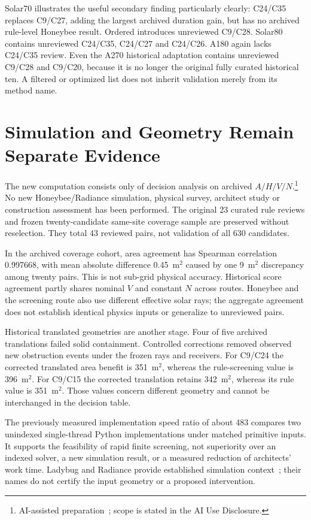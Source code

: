 \documentclass{llncs}
\newcommand{\aidraft}{\footnote{AI-assisted preparation~\cite{openai2026}; scope is stated in the AI Use Disclosure.}}
\begin{document}

Solar70 illustrates the useful secondary finding particularly clearly: C24/C35 replaces C9/C27, adding the largest archived duration gain, but has no archived rule-level Honeybee result. Ordered introduces unreviewed C9/C28. Solar80 contains unreviewed C24/C35, C24/C27 and C24/C26. A180 again lacks C24/C35 review. Even the A270 historical adaptation contains unreviewed C9/C28 and C9/C20, because it is no longer the original fully curated historical ten. A filtered or optimized list does not inherit validation merely from its method name.

\section{Simulation and Geometry Remain Separate Evidence}
The new computation consists only of decision analysis on archived $A/H/V/N$.\aidraft{} No new Honeybee/Radiance simulation, physical survey, architect study or construction assessment has been performed. The original 23 curated rule reviews and frozen twenty-candidate same-site coverage sample are preserved without reselection. They total 43 reviewed pairs, not validation of all 630 candidates.

In the archived coverage cohort, area agreement has Spearman correlation 0.997668, with mean absolute difference 0.45~m$^2$ caused by one 9~m$^2$ discrepancy among twenty pairs. This is not sub-grid physical accuracy. Historical score agreement partly shares nominal $V$ and constant $N$ across routes. Honeybee and the screening route also use different effective solar rays; the aggregate agreement does not establish identical physics inputs or generalize to unreviewed pairs.

Historical translated geometries are another stage. Four of five archived translations failed solid containment. Controlled corrections removed observed new obstruction events under the frozen rays and receivers. For C9/C24 the corrected translated area benefit is 351~m$^2$, whereas the rule-screening value is 396~m$^2$. For C9/C15 the corrected translation retains 342~m$^2$, whereas its rule value is 351~m$^2$. Those values concern different geometry and cannot be interchanged in the decision table.

The previously measured implementation speed ratio of about 483 compares two unindexed single-thread Python implementations under matched primitive inputs. It supports the feasibility of rapid finite screening, not superiority over an indexed solver, a new simulation result, or a measured reduction of architects' work time. Ladybug and Radiance provide established simulation context~\cite{roudsari2013ladybug,ward1994radiance}; their names do not certify the input geometry or a proposed intervention.
\end{document}
